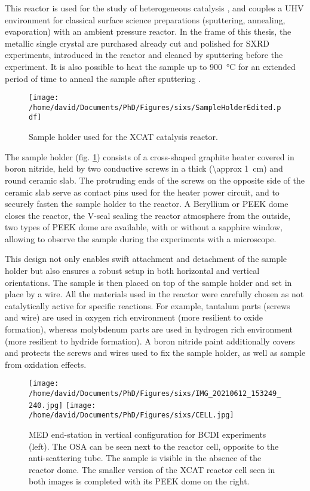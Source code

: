 This reactor is used for the study of heterogeneous catalysis \parencite{VanRijn2010, Resta2020a}, and couples a UHV environment for classical surface science preparations (sputtering, annealing, evaporation) with an ambient pressure reactor.
In the frame of this thesis, the metallic single crystal are purchased already cut and polished for SXRD experiments, introduced in the reactor and cleaned by sputtering \parencite{Taglauer1990} before the experiment.
It is also possible to heat the sample up to \qty{900}{\degreeCelsius} for an extended period of time to anneal the sample after sputtering \parencite{Musket1982}.

\begin{figure}[!htb]
    \centering
    \texttt{[image: /home/david/Documents/PhD/Figures/sixs/SampleHolderEdited.pdf]}
    \caption{
        Sample holder used for the XCAT catalysis reactor.
    }
    \label{fig:SampleHolder}
\end{figure}

The sample holder (fig. \ref{fig:SampleHolder}) consists of a cross-shaped graphite heater covered in boron nitride, held by two conductive screws in a thick (\qty{\approx 1}{\cm}) and round ceramic slab.
The protruding ends of the screws on the opposite side of the ceramic slab serve as contact pins used for the heater power circuit, and to securely fasten the sample holder to the reactor.
A Beryllium or PEEK dome closes the reactor, the V-seal sealing the reactor atmosphere from the outside, two types of PEEK dome are available, with or without a sapphire window, allowing to observe the sample during the experiments with a microscope.

This design not only enables swift attachment and detachment of the sample holder but also ensures a robust setup in both horizontal and vertical orientations.
The sample is then placed on top of the sample holder and set in place by a wire.
All the materials used in the reactor were carefully chosen as not catalytically active for specific reactions.
For example, tantalum parts (screws and wire) are used in oxygen rich environment (more resilient to oxide formation), whereas molybdenum parts are used in hydrogen rich environment (more resilient to hydride formation).
A boron nitride paint additionally covers and protects the screws and wires used to fix the sample holder, as well as sample from oxidation effects.

\begin{figure}[!htb]
    \centering
    \texttt{[image: /home/david/Documents/PhD/Figures/sixs/IMG\_20210612\_153249\_240.jpg]}
    \texttt{[image: /home/david/Documents/PhD/Figures/sixs/CELL.jpg]}
    \caption{
        MED end-station in vertical configuration for BCDI experiments (left).
        The OSA can be seen next to the reactor cell, opposite to the anti-scattering tube.
        The sample is visible in the absence of the reactor dome.
        The smaller version of the XCAT reactor cell seen in both images is completed with its PEEK dome on the right.
    }
    \label{fig:MEDV}
\end{figure}


